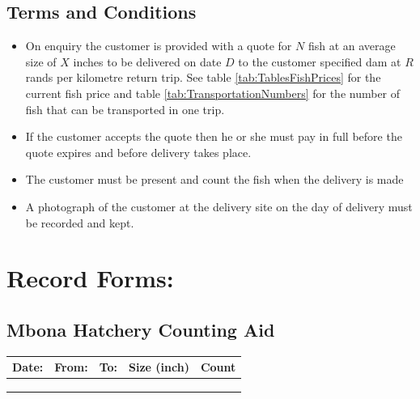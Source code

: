 \begin{appendices}
\subsection{Terms and Conditions}

\begin{itemize}
\item On enquiry the customer is provided with a quote for $N$ fish at an
average size of $X$ inches to be delivered on date $D$ to the customer
specified dam at $R$ rands per kilometre return trip. See table \ref{tab:TablesFishPrices}
for the current fish price and table \ref{tab:TransportationNumbers} for
the number of fish that can be transported in one trip.
\item If the customer accepts the quote then he or she must pay in full
before the quote expires and before delivery takes place.
\item The customer must be present and count the fish when the delivery is made
\item A photograph of the customer at the delivery site
on the day of delivery must be recorded and kept.
\end{itemize}

\newpage

\section{Record Forms:}

\clearpage\pagestyle{empty}
\begin{landscape}

\subsection{Mbona Hatchery Counting Aid}


\begin{tabular}{|c|c|c|c|c|}
\hline
Date: \hspace{3cm} & From: \hspace{3cm} & To: \hspace{3cm} & Size (inch)\hspace{1cm}  & Count \hspace{1cm} \\  \hline
                               &                                  &                              &                                         & \\ 
                               &                                  &                              &                                         & \\ 
                               &                                  &                              &                                         & \\ \hline
\end{tabular}


\end{landscape}
\end{appendices}
